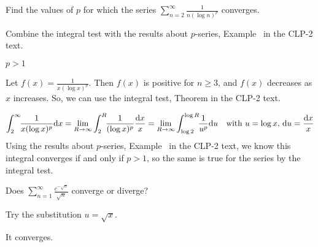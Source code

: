 \begin{question}[2014A]
Find the values of $p$ for which the series
$\displaystyle{\sum_{n=2}^\infty \frac{1}{n(\log n)^p}}$ converges.
\end{question}

\begin{hint}
Combine the integral test with the results about $p$-series, Example~
 in the CLP-2 text.
\end{hint}

\begin{answer}
$p>1$
\end{answer}

\begin{solution}
Let $f(x)=\frac{1}{x(\log x)^p}$. Then $f(x)$ is positive for $n \ge 3$, and $f(x)$ decreases as $x$ increases. So, we can use the integral test,
Theorem  in the CLP-2 text.

\begin{align*}
\int_2^\infty\!\! \frac{1}{x(\log x)^p} \mathrm{d}x
&=\lim_{R\rightarrow\infty}\int_2^R\!\! \frac{1}{(\log x)^p} \frac{\mathrm{d}x}{x}
=\lim_{R\rightarrow\infty}\int_{\log 2}^{\log R}\!\! \frac{1}{u^p} \mathrm{d}u
\quad\text{with $u=\log x$, $\mathrm{d}u=\frac{\mathrm{d}x}{x}$} \\
\end{align*}
Using the results about $p$-series, Example~ in the CLP-2 text,
we know this integral converges if and only if $p>1$, so the same is true for the
series by the integral test.
\end{solution}

\begin{Mquestion}[2016A]
Does ${\displaystyle\sum_{n=1}^\infty\frac{e^{-\sqrt{n}}}{\sqrt{n}}}$ converge or diverge?
\end{Mquestion}

\begin{hint}
Try the substitution $u=\sqrt{x}$.
\end{hint}

\begin{answer}
It converges.
\end{answer}

